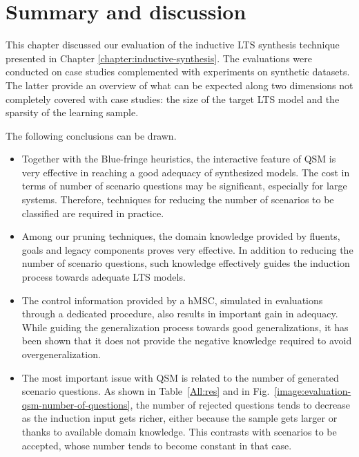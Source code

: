 \section{Summary and discussion\label{section:evaluation-summary}}

This chapter discussed our evaluation of the inductive LTS synthesis technique presented in Chapter \ref{chapter:inductive-synthesis}. The evaluations were conducted on case studies complemented with experiments on synthetic datasets. The latter provide an overview of what can be expected along two dimensions not completely covered with case studies: the size of the target LTS model and the sparsity of the learning sample.  

The following conclusions can be drawn.
\begin{itemize}

\item Together with the Blue-fringe heuristics, the interactive feature of QSM is very effective in reaching a good adequacy of synthesized models. The cost in terms of number of scenario questions may be significant, especially for large systems. Therefore, techniques for reducing the number of scenarios to be classified are required in practice.

\item Among our pruning techniques, the domain knowledge provided by fluents, goals and legacy components proves very effective. In addition to reducing the number of scenario questions, such knowledge effectively guides the induction process towards adequate LTS models. 

\item The control information provided by a hMSC, simulated in evaluations through a dedicated procedure, also results in important gain in adequacy. While guiding the generalization process towards good generalizations, it has been shown that it does not provide the negative knowledge required to avoid overgeneralization.

\item The most important issue with QSM is related to the number of generated scenario questions. As shown in Table~\ref{All:res} and in Fig.~\ref{image:evaluation-qsm-number-of-questions}, the number of rejected questions tends to decrease as the induction input gets richer, either because the sample gets larger or thanks to available domain knowledge. This contrasts with scenarios to be accepted, whose number tends to become constant in that case.


\end{itemize}
